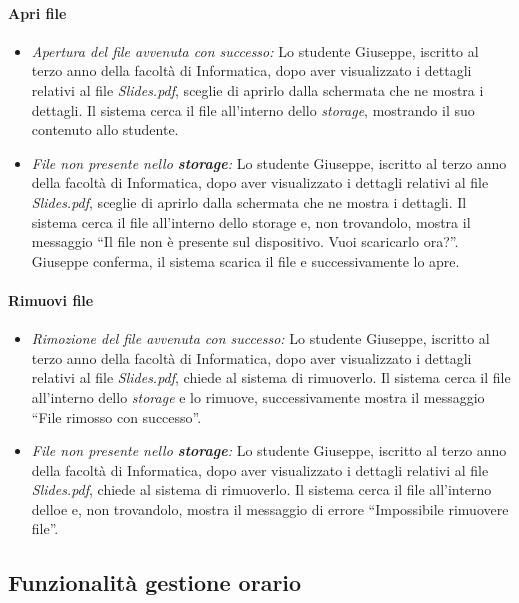 \paragraph{Apri file}
\begin{itemize}
	\item \textit{Apertura del file avvenuta con successo:}
	Lo studente Giuseppe, iscritto al terzo anno della facoltà di Informatica, dopo aver visualizzato i dettagli relativi al file \textit{Slides.pdf}, sceglie di aprirlo dalla schermata che ne mostra i dettagli. Il sistema cerca il file all'interno dello \textit{storage}, mostrando il suo contenuto allo studente.
	
	\item \textit{File non presente nello \textbf{storage}:}
	Lo studente Giuseppe, iscritto al terzo anno della facoltà di Informatica, dopo aver visualizzato i dettagli relativi al file \textit{Slides.pdf}, sceglie di aprirlo dalla schermata che ne mostra i dettagli. Il sistema cerca il file all'interno dello storage e, non trovandolo, mostra il messaggio “Il file non è presente sul dispositivo. Vuoi scaricarlo ora?”. Giuseppe conferma, il sistema scarica il file e successivamente lo apre.
\end{itemize}

\paragraph{Rimuovi file}
\begin{itemize}
	\item \textit{Rimozione del file avvenuta con successo:}
	Lo studente Giuseppe, iscritto al terzo anno della facoltà di Informatica, dopo aver visualizzato i dettagli relativi al file \textit{Slides.pdf}, chiede al sistema di rimuoverlo. Il sistema cerca il file all'interno dello \textit{storage} e lo rimuove, successivamente mostra il messaggio “File rimosso con successo”.
	
	\item \textit{File non presente nello \textbf{storage}:}
	Lo studente Giuseppe, iscritto al terzo anno della facoltà di Informatica, dopo aver visualizzato i dettagli relativi al file \textit{Slides.pdf}, chiede al sistema di rimuoverlo. Il sistema cerca il file all'interno delloe e, non trovandolo, mostra il messaggio di errore “Impossibile rimuovere file”.
\end{itemize}

\subsection{Funzionalità gestione orario}
